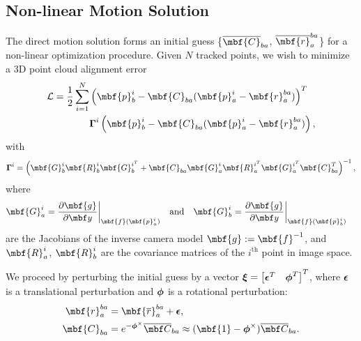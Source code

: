 \documentclass[letterpaper, 10 pt, conference]{ieeeconf}  %
\begin{document}
\subsection{Non-linear Motion Solution}

The direct motion solution forms an initial guess \{$\overline{\mbf{C}}_{ba}$, $\overline{\mbf{r}}_a^{ba}$\} for a non-linear optimization procedure. 
Given $N$ tracked points, we wish to minimize a 3D point cloud alignment error
\begin{align} \label{eqn:matrixOptfun}
\mathcal{L} = \frac{1}{2} \sum_{i=1}^{N} & \left( \mbf{p}_b^i - \mbf{C}_{ba}(\mbf{p}_a^i - \mbf{r}_a^{ba}) \right)^T \notag \\
                                        & \mbs{\Gamma}^i \left( \mbf{p}_b^i - \mbf{C}_{ba}(\mbf{p}_a^i - \mbf{r}_a^{ba}) \right),
\end{align}
with
\begin{equation} \label{eqn:gamma}
\mbs{\Gamma}^i = \left( \mbf{G}_b^i \mbf{R}_b^{i} \mbf{G}_b^{i^T} + \mbf{C}_{ba} \mbf{G}_a^i \mbf{R}_a^{i^T} \mbf{G}_a^{i^T} \mbf{C}_{ba}^T   \right)^{-1},
\end{equation}
where
\begin{align}
\mbf{G}_a^i &= \frac{\partial \mbf{g} }{\partial \mbf y }\bigg|_{\mbf{f}(\mbf{p}^i_a)} & \text{and} && \mbf{G}_b^i &= \frac{\partial \mbf{g} }{\partial \mbf y }\bigg|_{\mbf{f}(\mbf{p}^i_b)}
\end{align}
are the Jacobians of the inverse camera model $\mbf{g} := \mbf{f}^{-1}$, and $\mbf{R}_a^{i}$, $\mbf{R}_b^{i}$ are the covariance matrices of the $i^\text{th}$ point in image space. 

We proceed by perturbing the initial guess by a vector $\boldsymbol{\xi} = \begin{bmatrix}\boldsymbol{\epsilon}^T & \boldsymbol{\phi}^T \end{bmatrix}^T$, where $\boldsymbol{\epsilon}$ is a translational perturbation and $\boldsymbol{\phi}$ is a rotational perturbation:
\begin{align}
\mbf{r}_a^{ba} &= \mbf{\overline{r}}_a^{ba} + \mbs{\epsilon}, \label{eqn:trans_perturb} \\
\mbf{C}_{ba} &= e^{-\mbs{\phi}^{\times}} \mbfbar{C}_{ba} \approx (\mbf{1} - \mbs{\phi}^{\times})\mbfbar{C}_{ba}. \label{eqn:rot_perturb}
\end{align}
\end{document}
